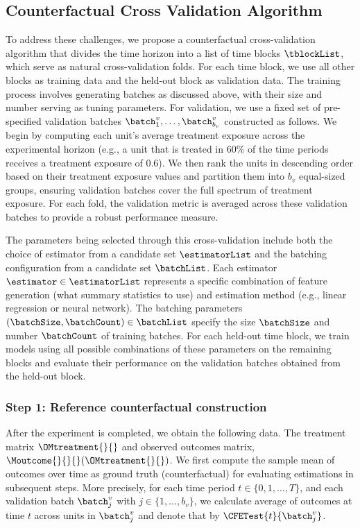 \subsection{Counterfactual Cross Validation Algorithm}
\label{sec:CCV_Algorithm}
% 
To address these challenges, we propose a counterfactual cross-validation algorithm that divides the time horizon into a list of time blocks $\tblockList$, which serve as natural cross-validation folds. For each time block, we use all other blocks as training data and the held-out block as validation data. The training process involves generating batches as discussed above, with their size and number serving as tuning parameters. For validation, we use a fixed set of pre-specified validation batches $\batch_1^v, \ldots, \batch_{b_v}^v$ constructed as follows. We begin by computing each unit's average treatment exposure across the experimental horizon (e.g., a unit that is treated in 60\% of the time periods receives a treatment exposure of 0.6). We then rank the units in descending order based on their treatment exposure values and partition them into $b_v$ equal-sized groups, ensuring validation batches cover the full spectrum of treatment exposure. For each fold, the validation metric is averaged across these validation batches to provide a robust performance measure.

The parameters being selected through this cross-validation include both the choice of estimator from a candidate set $\estimatorList$ and the batching configuration from a candidate set $\batchList$. Each estimator $\estimator \in \estimatorList$ represents a specific combination of feature generation (what summary statistics to use) and estimation method (e.g., linear regression or neural network). The batching parameters $(\batchSize,\batchCount)\in\batchList$ specify the size $\batchSize$ and number $\batchCount$ of training batches. For each held-out time block, we train models using all possible combinations of these parameters on the remaining blocks and evaluate their performance on the validation batches obtained from the held-out block. 

\subsubsection*{Step 1: Reference counterfactual construction}
% 
After the experiment is completed, we obtain the following data. The treatment matrix $\OMtreatment{}{}$ and observed outcomes matrix, $\Moutcome{}{}{}(\OMtreatment{}{})$. 
We first compute the sample mean of outcomes over time as ground truth (counterfactual) for evaluating estimations in subsequent steps. More precisely, for each time period $t\in\{0,1,\ldots,T\}$, and each validation batch $\batch_{j}^v$ with $j\in \{1,\ldots,b_v\}$, we calculate average of outcomes at time $t$ across units in $\batch_{j}^v$ and denote that by $\CFETest{t}{\batch_{j}^v}$.

